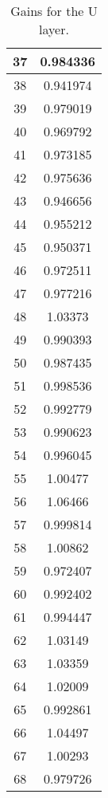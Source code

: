 \begin{table}[h]
\begin{subtable}[h]{2in}
{\begin{tabular}{|c|c|}
37	&	0.984336	\\	\hline
38	&	0.941974	\\	\hline
39	&	0.979019	\\	\hline
40	&	0.969792	\\	\hline
41	&	0.973185	\\	\hline
42	&	0.975636	\\	\hline
43	&	0.946656	\\	\hline
44	&	0.955212	\\	\hline
45	&	0.950371	\\	\hline
46	&	0.972511	\\	\hline
47	&	0.977216	\\	\hline
48	&	1.03373	\\	\hline
49	&	0.990393	\\	\hline
50	&	0.987435	\\	\hline
51	&	0.998536	\\	\hline
52	&	0.992779	\\	\hline
53	&	0.990623	\\	\hline
54	&	0.996045	\\	\hline
55	&	1.00477	\\	\hline
56	&	1.06466	\\	\hline
57	&	0.999814	\\	\hline
58	&	1.00862	\\	\hline
59	&	0.972407	\\	\hline
60	&	0.992402	\\	\hline
61	&	0.994447	\\	\hline
62	&	1.03149	\\	\hline
63	&	1.03359	\\	\hline
64	&	1.02009	\\	\hline
65	&	0.992861	\\	\hline
66	&	1.04497	\\	\hline
67	&	1.00293	\\	\hline
68	&	0.979726	\\	\hline
        \end{tabular}
        }
        \caption{Gains for the U layer.}
    \end{subtable}
    \quad
    \begin{subtable}[h]{2in}
        \centering{}
\end{subtable}
\end{table}
